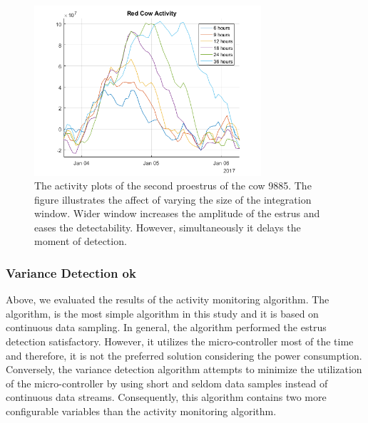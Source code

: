 \documentclass[english,12pt,a4paper,pdftex,elec,utf8]{aaltothesis}
\begin{document}
\begin{figure}[htb]
\centering
\includegraphics[width = 0.75\textwidth]{figures/redcowactivity2.png}
\caption{The activity plots of the second proestrus of the cow 9885. The figure illustrates the affect of varying the size of the integration window. Wider window increases the amplitude of the estrus and eases the detectability. However, simultaneously it delays the moment of detection. }
\label{integrationwindows}
\end{figure}




\subsubsection{Variance Detection ok} \label{variancedetectionevaluation}

Above, we evaluated the results of the activity monitoring algorithm. The algorithm, is the most simple algorithm in this study and it is based on continuous data sampling. In general, the algorithm performed the estrus detection satisfactory. However, it utilizes the micro-controller most of the time and therefore, it is not the preferred solution considering the power consumption. Conversely, the variance detection algorithm attempts to minimize the utilization of the micro-controller by using short and seldom data samples instead of continuous data streams. Consequently, this algorithm contains two more configurable variables than the activity monitoring algorithm.
\end{document}
